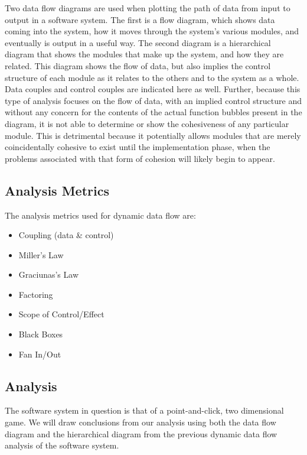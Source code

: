 \documentclass{article}
\begin{document}
		Two data flow diagrams are used when plotting the path of data from input to output in a software system. The first is a flow diagram, which shows data coming into the system, how it moves through the system's various modules, and eventually is output in a useful way. The second diagram is a hierarchical diagram that shows the modules that make up the system, and how they are related. This diagram shows the flow of data, but also implies the control structure of each module as it relates to the others and to the system as a whole. Data couples and control couples are indicated here as well. Further, because this type of analysis focuses on the flow of data, with an implied control structure and without any concern for the contents of the actual function bubbles present in the diagram, it is not able to determine or show the cohesiveness of any particular module. This is detrimental because it potentially allows modules that are merely coincidentally cohesive to exist until the implementation phase, when the problems associated with that form of cohesion will likely begin to appear. 
	\subsection{Analysis Metrics}
		The analysis metrics used for dynamic data flow are:
		\begin{itemize}
			\item Coupling (data \& control)
			\item Miller's Law
			\item Graciunas's Law
			\item Factoring
			\item Scope of Control/Effect
			\item Black Boxes
			\item Fan In/Out
		\end{itemize}
	\subsection{Analysis}
		The software system in question is that of a point-and-click, two dimensional game. We will draw conclusions from our analysis using both the data flow diagram and the hierarchical diagram from the previous dynamic data flow analysis of the software system. 
\end{document}
